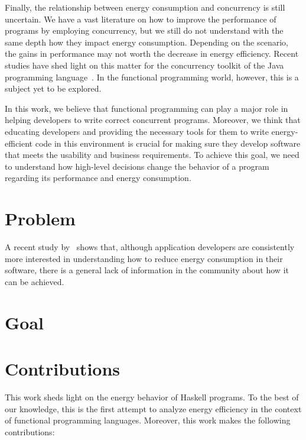 Finally, the relationship between energy consumption and concurrency is still uncertain. We have a vast literature on how to improve the performance of programs by employing concurrency, but we still do not understand with the same depth how they impact energy consumption. Depending on the scenario, the gains in performance may not worth the decrease in energy efficiency. Recent studies have shed light on this matter for the concurrency toolkit of the Java programming language~\cite{pinto:2014,pinto:2016}. In the functional programming world, however, this is a subject yet to be explored.

In this work, we believe that functional programming can play a major role in helping developers to write correct concurrent programs. Moreover, we think that educating developers and providing the necessary tools for them to write energy-efficient code in this environment is crucial for making sure they develop software that meets the usability and business requirements. To achieve this goal, we need to understand how high-level decisions change the behavior of a program regarding its performance and energy consumption.


\section{Problem}
A recent study by~ shows that, although application developers are consistently more interested in understanding how to reduce energy consumption in their software, there is a general lack of information in the community about how it can be achieved.


\section{Goal}
\lipsum[1-1]


\section{Contributions}
This work sheds light on the energy behavior of Haskell programs. To the best of our knowledge, this is the first attempt to analyze energy efficiency in the context of functional programming languages. Moreover, this work makes the following contributions:

